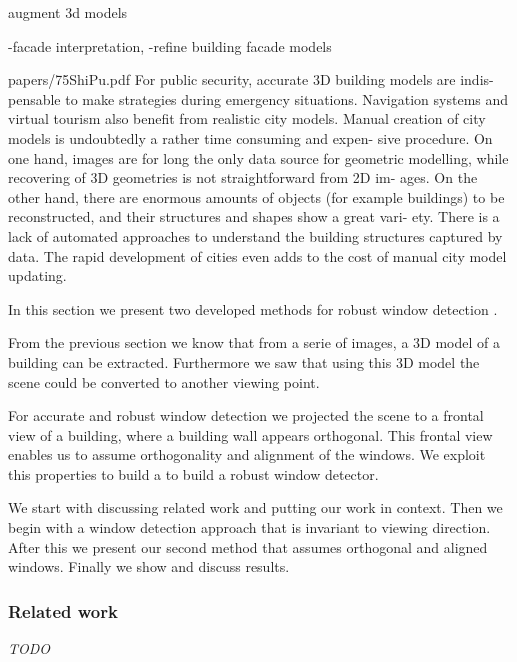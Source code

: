 augment 3d models


-facade interpretation, 
-refine building facade models



papers/75ShiPu.pdf
 For public security, accurate 3D building models are indis-
 pensable to make strategies during emergency situations. Navigation systems and
 virtual tourism also benefit from realistic city models.
 Manual creation of city models is undoubtedly a rather time consuming and expen-
 sive procedure. On one hand, images are for long the only data source for geometric
 modelling, while recovering of 3D geometries is not straightforward from 2D im-
 ages. On the other hand, there are enormous amounts of objects (for example
 buildings) to be reconstructed, and their structures and shapes show a great vari-
 ety. There is a lack of automated approaches to understand the building structures
 captured by data. The rapid development of cities even adds to the cost of manual
 city model updating.















In this section we present two developed methods for robust window detection .

From the previous section we know that from a serie of images, a 3D model of a
building can be extracted. Furthermore we saw that using this 3D model the
scene could be converted to another viewing point. 

For accurate and robust window detection we projected the scene to a frontal
view of a building, where a building wall appears orthogonal. This frontal
view enables us to assume orthogonality and alignment of the windows. We
exploit this properties to build a to build a robust window detector.

We start with discussing related work and putting our work in context.  Then we
begin with a window detection approach that is invariant to viewing direction.
After this we present our second method that assumes orthogonal and aligned
windows.  Finally we show and discuss results. 


\subsubsection{Related work}
\emph{TODO}

